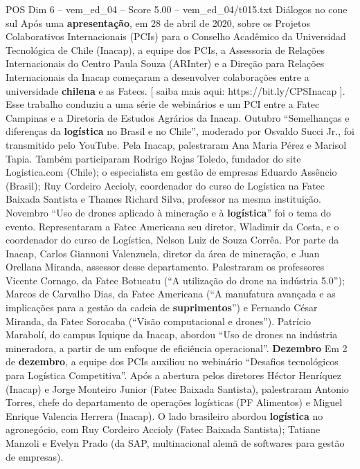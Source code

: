 \begin{textsample}{POS Dim 6 – vem\_ed\_04 – Score 5.00 – vem\_ed\_04/t015.txt}  \label{ex:f6_pos_137}
Diálogos no cone sul Após uma \textbf{apresentação}, em 28 de abril de 2020, sobre os Projetos Colaborativos Internacionais (PCIs) para o Conselho Acadêmico da Universidad Tecnológica de Chile (Inacap), a equipe dos PCIs, a Assessoria de Relações Internacionais do Centro Paula Souza (ARInter) e a Direção para Relações Internacionais da Inacap começaram a desenvolver colaborações entre a universidade \textbf{chilena} e as Fatecs. [ saiba mais aqui: https://bit.ly/CPSInacap ].
Esse trabalho conduziu a uma série de webinários e um PCI entre a Fatec Campinas e a Diretoria de Estudos Agrários da Inacap.
Outubro “Semelhanças e diferenças da \textbf{logística} no Brasil e no Chile”, moderado por Osvaldo Succi Jr., foi transmitido pelo YouTube.
Pela Inacap, palestraram Ana Maria Pérez e Marisol Tapia.
Também participaram Rodrigo Rojas Toledo, fundador do site Logistica.com (Chile); o especialista em gestão de empresas Eduardo Assêncio (Brasil); Ruy Cordeiro Accioly, coordenador do curso de Logística na Fatec Baixada Santista e Thames Richard Silva, professor na mesma instituição.
Novembro “Uso de drones aplicado à mineração e à \textbf{logística}” foi o tema do evento.
Representaram a Fatec Americana seu diretor, Wladimir da Costa, e o coordenador do curso de Logística, Nelson Luiz de Souza Corrêa.
Por parte da Inacap, Carlos Giannoni Valenzuela, diretor da área de mineração, e Juan Orellana Miranda, assessor desse departamento.
Palestraram os professores Vicente Cornago, da Fatec Botucatu (“A utilização do drone na indústria 5.0”); Marcos de Carvalho Dias, da Fatec Americana (“A manufatura avançada e as implicações para a gestão da cadeia de \textbf{suprimentos}”) e Fernando César Miranda, da Fatec Sorocaba (“Visão computacional e drones”).
Patrício Marabolí, do campus Iquique da Inacap, abordou “Uso de drones na indústria mineradora, a partir de um enfoque de eficiência operacional”. \textbf{Dezembro} Em 2 de \textbf{dezembro}, a equipe dos PCIs auxiliou no webinário “Desafios tecnológicos para Logística Competitiva”.
Após a abertura pelos diretores Héctor Henríquez (Inacap) e Jorge Monteiro Junior (Fatec Baixada Santista), palestraram Antonio Torres, chefe do departamento de operações logísticas (PF Alimentos) e Miguel Enrique Valencia Herrera (Inacap).
O lado brasileiro abordou \textbf{logística} no agronegócio, com Ruy Cordeiro Accioly (Fatec Baixada Santista); Tatiane Manzoli e Evelyn Prado (da SAP, multinacional alemã de softwares para gestão de empresas).

\end{textsample}
